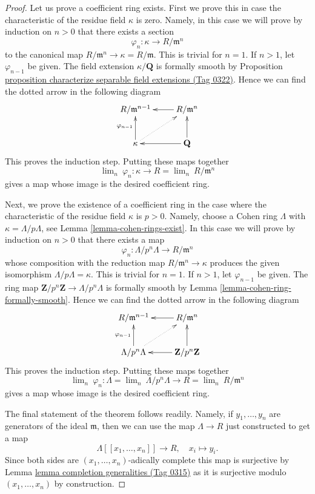 \documentclass{amsart}
\theoremstyle{plain}
\theoremstyle{definition}
\theoremstyle{remark}
\numberwithin{equation}{subsection}
\def\lim{\mathop{\mathrm{lim}}\nolimits}
\begin{document}
\begin{proof}
Let us prove a coefficient ring exists.
First we prove this in case the characteristic of the residue field $\kappa$
is zero. Namely, in this case we will prove by induction
on $n > 0$ that there exists a section
$$
\varphi_n : \kappa \longrightarrow R/\mathfrak m^n
$$
to the canonical map $R/\mathfrak m^n \to \kappa = R/\mathfrak m$.
This is trivial for $n = 1$. If $n > 1$, let $\varphi_{n - 1}$ be given.
The field extension $\kappa/\mathbf{Q}$ is formally smooth by
Proposition \href{https://stacks.math.columbia.edu/tag/0322}{proposition characterize separable field extensions (Tag 0322)}.
Hence we can find the dotted arrow
in the following diagram
$$
\xymatrix{
R/\mathfrak m^{n - 1} &
R/\mathfrak m^n \ar[l] \\
\kappa \ar[u]^{\varphi_{n - 1}} \ar@{..>}[ru] & \mathbf{Q} \ar[l] \ar[u]
}
$$
This proves the induction step. Putting these maps together
$$
\lim_n\ \varphi_n : \kappa \longrightarrow
R = \lim_n\ R/\mathfrak m^n
$$
gives a map whose image is the desired coefficient ring.

\medskip\noindent
Next, we prove the existence of a coefficient ring in the case
where the characteristic of the residue field $\kappa$ is $p > 0$.
Namely, choose a Cohen ring $\Lambda$ with $\kappa = \Lambda/p\Lambda$,
see Lemma \ref{lemma-cohen-rings-exist}. In this case we will prove by
induction on $n > 0$ that there exists a map
$$
\varphi_n :
\Lambda/p^n\Lambda
\longrightarrow
R/\mathfrak m^n
$$
whose composition with the reduction map $R/\mathfrak m^n \to \kappa$
produces the given isomorphism $\Lambda/p\Lambda = \kappa$. This is trivial
for $n = 1$. If $n > 1$, let $\varphi_{n - 1}$ be given.
The ring map $\mathbf{Z}/p^n\mathbf{Z} \to \Lambda/p^n\Lambda$
is formally smooth by Lemma \ref{lemma-cohen-ring-formally-smooth}.
Hence we can find the dotted arrow
in the following diagram
$$
\xymatrix{
R/\mathfrak m^{n - 1} &
R/\mathfrak m^n \ar[l] \\
\Lambda/p^n\Lambda \ar[u]^{\varphi_{n - 1}} \ar@{..>}[ru] &
\mathbf{Z}/p^n\mathbf{Z} \ar[l] \ar[u]
}
$$
This proves the induction step. Putting these maps together
$$
\lim_n\ \varphi_n :
\Lambda = \lim_n\ \Lambda/p^n\Lambda
\longrightarrow
R = \lim_n\ R/\mathfrak m^n
$$
gives a map whose image is the desired coefficient ring.

\medskip\noindent
The final statement of the theorem follows readily. Namely, if
$y_1, \ldots, y_n$ are generators of the ideal $\mathfrak m$,
then we can use the map $\Lambda \to R$ just constructed
to get a map
$$
\Lambda[[x_1, \ldots, x_n]] \longrightarrow R,
\quad x_i \longmapsto y_i.
$$
Since both sides are $(x_1, \ldots, x_n)$-adically complete
this map is surjective by Lemma \href{https://stacks.math.columbia.edu/tag/0315}{lemma completion generalities (Tag 0315)}
as it is surjective modulo $(x_1, \ldots, x_n)$ by
construction.
\end{proof}
\end{document}
